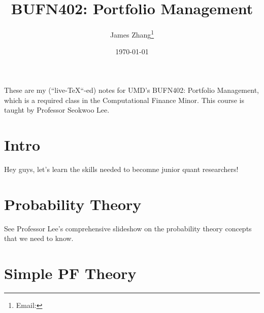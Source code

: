 \documentclass[12pt]{scrartcl}
\begin{document}
\title{BUFN402: Portfolio Management}
\author{James Zhang\thanks{Email: }}
\date{\today}



\maketitle
    These are my (``live-\TeX``-ed) notes for UMD's BUFN402: Portfolio Management, 
    which is a required class in the Computational Finance Minor. This course is taught by Professor Seokwoo Lee. 
\tableofcontents
\newpage

\section{Intro}

Hey guys, let's learn the skills needed to becomne junior quant researchers!

\section{Probability Theory}

See Professor Lee's comprehensive slideshow on the probability theory concepts that 
we need to know.


\section{Simple PF Theory}
\end{document}
